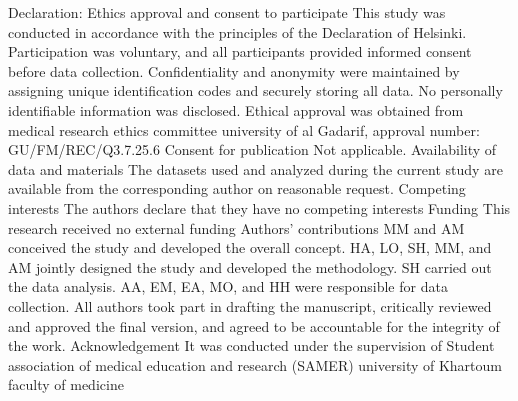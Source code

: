 Declaration:
Ethics approval and consent to participate
This study was conducted in accordance with the principles of the Declaration of Helsinki. Participation was voluntary, and all participants provided informed consent before data collection. Confidentiality and anonymity were maintained by assigning unique identification codes and securely storing all data. No personally identifiable information was disclosed. Ethical approval was obtained from medical research ethics committee university of al Gadarif, approval number: GU/FM/REC/Q3.7.25.6
Consent for publication
Not applicable.
Availability of data and materials
The datasets used and analyzed during the current study are available from the corresponding author on reasonable request.
Competing interests
The authors declare that they have no competing interests
Funding
This research received no external funding
Authors' contributions
MM and AM conceived the study and developed the overall concept.
HA, LO, SH, MM, and AM jointly designed the study and developed the methodology.
SH carried out the data analysis.
AA, EM, EA, MO, and HH were responsible for data collection.
All authors took part in drafting the manuscript, critically reviewed and approved the final version, and agreed to be accountable for the integrity of the work.
Acknowledgement
It was conducted under the supervision of Student association of medical education and research (SAMER) university of Khartoum faculty of medicine

